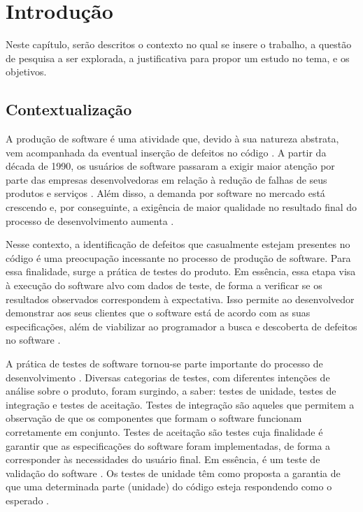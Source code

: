 \chapter[Introdução]{Introdução}

Neste capítulo, serão descritos o contexto no qual se insere o trabalho, a
questão de pesquisa a ser explorada, a justificativa para propor um estudo no
tema, e os objetivos.

\section{Contextualização}
\indent A produção de software é uma atividade que, devido à sua natureza
abstrata, vem acompanhada da eventual inserção de defeitos no código
\cite{trodo2009}. A partir da década de 1990, os usuários de software
passaram a exigir maior atenção por parte das empresas desenvolvedoras em 
relação à redução de falhas de seus produtos e serviços
\cite{sommerville2007}. Além disso, a demanda por software no mercado está
crescendo \cite{philipson2004} e, por conseguinte, a exigência de maior
qualidade no resultado final do processo de desenvolvimento aumenta
\cite{barbosaEtAl2009}.
\par
\indent Nesse contexto, a identificação de defeitos que casualmente estejam
presentes no código é uma preocupação incessante no processo de produção de
software. Para essa finalidade, surge a prática de testes do produto. Em
essência, essa etapa visa à execução do software alvo com dados de teste, de
forma a verificar se os resultados observados correspondem à expectativa.
Isso permite ao desenvolvedor demonstrar aos seus clientes que o software
está de acordo com as suas especificações, além de viabilizar ao
programador a busca e descoberta de defeitos no software
\cite{sommerville2007}.
\par
\indent A prática de testes de software tornou-se parte importante do
processo de desenvolvimento \cite{barbosaEtAl2009}. Diversas categorias de
testes, com diferentes intenções de análise sobre o produto, foram surgindo,
a saber: testes de unidade, testes de integração e testes de aceitação.
Testes de integração são aqueles que permitem a observação de que os
componentes que formam o software funcionam corretamente em conjunto. Testes
de aceitação são testes cuja finalidade é garantir que as especificações do software foram implementadas, de forma a corresponder às necessidades do usuário final. Em essência, é um teste de validação do software \cite{sommerville2007}. Os testes de unidade têm como proposta a garantia  de que uma determinada parte (unidade) do código esteja respondendo como o esperado \cite{sommerville2007}. 
